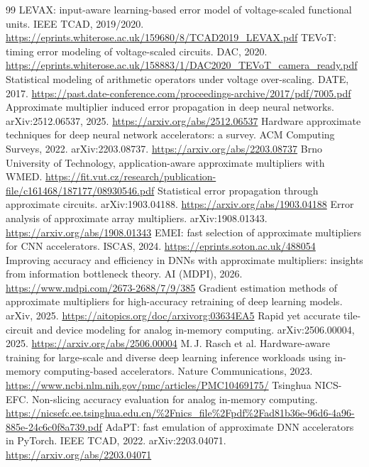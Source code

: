 \documentclass[11pt,a4paper]{ctexart}
\begin{document}
\begin{thebibliography}{99}
 LEVAX: input-aware learning-based error model of voltage-scaled functional units. IEEE TCAD, 2019/2020. \url{https://eprints.whiterose.ac.uk/159680/8/TCAD2019_LEVAX.pdf}
 TEVoT: timing error modeling of voltage-scaled circuits. DAC, 2020. \url{https://eprints.whiterose.ac.uk/158883/1/DAC2020_TEVoT_camera_ready.pdf}
 Statistical modeling of arithmetic operators under voltage over-scaling. DATE, 2017. \url{https://past.date-conference.com/proceedings-archive/2017/pdf/7005.pdf}
 Approximate multiplier induced error propagation in deep neural networks. arXiv:2512.06537, 2025. \url{https://arxiv.org/abs/2512.06537}
 Hardware approximate techniques for deep neural network accelerators: a survey. ACM Computing Surveys, 2022. arXiv:2203.08737. \url{https://arxiv.org/abs/2203.08737}
 Brno University of Technology, application-aware approximate multipliers with WMED. \url{https://fit.vut.cz/research/publication-file/c161468/187177/08930546.pdf}
 Statistical error propagation through approximate circuits. arXiv:1903.04188. \url{https://arxiv.org/abs/1903.04188}
 Error analysis of approximate array multipliers. arXiv:1908.01343. \url{https://arxiv.org/abs/1908.01343}
 EMEI: fast selection of approximate multipliers for CNN accelerators. ISCAS, 2024. \url{https://eprints.soton.ac.uk/488054}
 Improving accuracy and efficiency in DNNs with approximate multipliers: insights from information bottleneck theory. AI (MDPI), 2026. \url{https://www.mdpi.com/2673-2688/7/9/385}
 Gradient estimation methods of approximate multipliers for high-accuracy retraining of deep learning models. arXiv, 2025. \url{https://aitopics.org/doc/arxivorg:03634EA5}
 Rapid yet accurate tile-circuit and device modeling for analog in-memory computing. arXiv:2506.00004, 2025. \url{https://arxiv.org/abs/2506.00004}
 M.\,J. Rasch et al. Hardware-aware training for large-scale and diverse deep learning inference workloads using in-memory computing-based accelerators. Nature Communications, 2023. \url{https://www.ncbi.nlm.nih.gov/pmc/articles/PMC10469175/}
 Tsinghua NICS-EFC. Non-slicing accuracy evaluation for analog in-memory computing. \url{https://nicsefc.ee.tsinghua.edu.cn/%2Fnics_file%2Fpdf%2Fad81b36e-96d6-4a96-885e-24c6c0f8a739.pdf}
 AdaPT: fast emulation of approximate DNN accelerators in PyTorch. IEEE TCAD, 2022. arXiv:2203.04071. \url{https://arxiv.org/abs/2203.04071}

\end{thebibliography}
\end{document}

